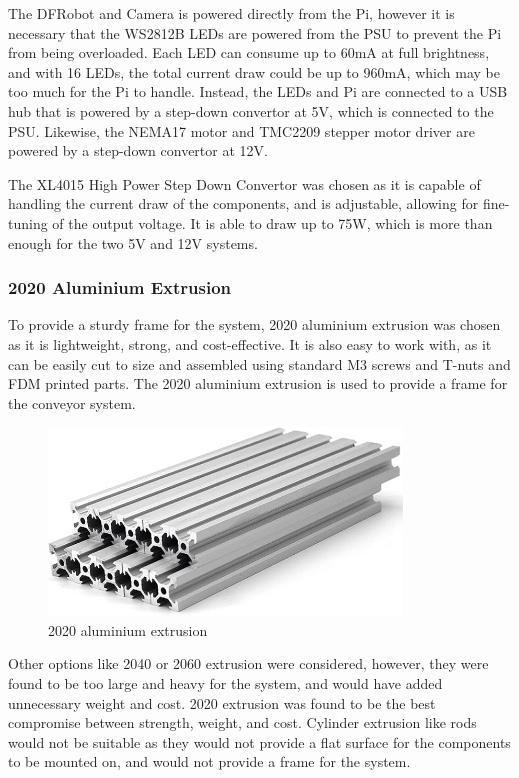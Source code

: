 The DFRobot and Camera is powered directly from the Pi, however it is necessary that the WS2812B LEDs are powered from the PSU to prevent the Pi from being overloaded. Each LED can consume up to 60mA at full brightness, and with 16 LEDs, the total current draw could be up to 960mA, which may be too much for the Pi to handle. Instead, the LEDs and Pi are connected to a USB hub that is powered by a step-down convertor at 5V, which is connected to the PSU. Likewise, the NEMA17 motor and TMC2209 stepper motor driver are powered by a step-down convertor at 12V.

The XL4015 High Power Step Down Convertor was chosen as it is capable of handling the current draw of the components, and is adjustable, allowing for fine-tuning of the output voltage. It is able to draw up to 75W, which is more than enough for the two 5V and 12V systems.

\subsubsection{2020 Aluminium Extrusion}
To provide a sturdy frame for the system, 2020 aluminium extrusion was chosen as it is lightweight, strong, and cost-effective. It is also easy to work with, as it can be easily cut to size and assembled using standard M3 screws and T-nuts and FDM printed parts. The 2020 aluminium extrusion is used to provide a frame for the conveyor system.

\begin{figure}[H]
    \begin{minipage}[h]{\textwidth}
        \centering
        \includegraphics[height=5cm]{imgs/parts/aluminium2020.jpg}
        \caption{2020 aluminium extrusion \cite{aluminium2020}}
    \end{minipage}
\end{figure}

Other options like 2040 or 2060 extrusion were considered, however, they were found to be too large and heavy for the system, and would have added unnecessary weight and cost. 2020 extrusion was found to be the best compromise between strength, weight, and cost. Cylinder extrusion like rods would not be suitable as they would not provide a flat surface for the components to be mounted on, and would not provide a frame for the system.

